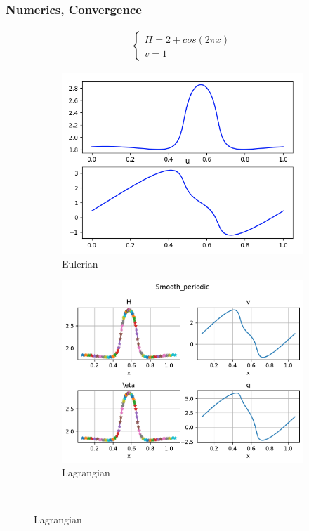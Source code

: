 \documentclass[pt12]{beamer}
\begin{document}
\begin{frame}
\frametitle{Numerics, Convergence}

\begin{align*}
\begin{cases}
H=2+cos(2\pi x)\\
v=1
\end{cases}
\end{align*}


\begin{figure}
     \centering
     \begin{subfigure}[b]{0.40\textwidth}
         \centering
         \includegraphics[width=\textwidth]{figures/smooth_periodic/eul.png}
         \caption{Eulerian}
     \end{subfigure}
     \begin{subfigure}[b]{0.50\textwidth}
         \centering
         \includegraphics[width=\textwidth]{figures/smooth_periodic/lagr.pdf}
         \caption{Lagrangian}
     \end{subfigure}\\
\end{figure}





\end{frame}
\end{document}
